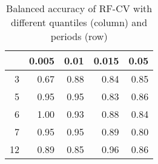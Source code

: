 \begin{table}[ht]
\centering
\begin{tabular}{rrrrr}
  \hline
 & 0.005 & 0.01 & 0.015 & 0.05 \\ 
  \hline
3 & 0.67 & 0.88 & 0.84 & 0.85 \\ 
  5 & 0.95 & 0.95 & 0.83 & 0.86 \\ 
  6 & 1.00 & 0.93 & 0.88 & 0.84 \\ 
  7 & 0.95 & 0.95 & 0.89 & 0.80 \\ 
  12 & 0.89 & 0.85 & 0.96 & 0.86 \\ 
   \hline
\end{tabular}
\caption{Balanced accuracy of RF-CV with different quantiles (column) and periods (row)} 
\label{tab:rob}
\end{table}
